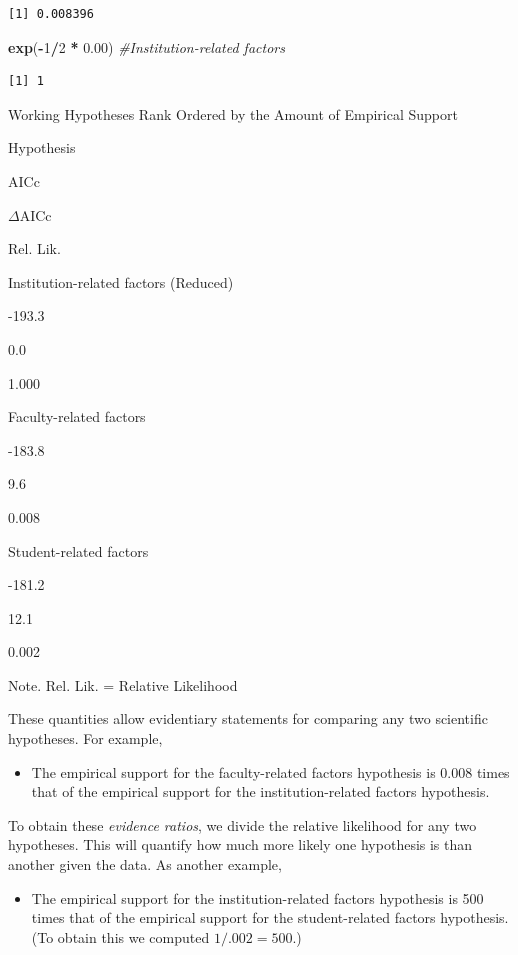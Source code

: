 \documentclass[]{book}
\newenvironment{Shaded}{\begin{snugshade}}{\end{snugshade}}
\newcommand{\CommentTok}[1]{\textcolor[rgb]{0.56,0.35,0.01}{\textit{#1}}}
\newcommand{\DecValTok}[1]{\textcolor[rgb]{0.00,0.00,0.81}{#1}}
\newcommand{\FloatTok}[1]{\textcolor[rgb]{0.00,0.00,0.81}{#1}}
\newcommand{\KeywordTok}[1]{\textcolor[rgb]{0.13,0.29,0.53}{\textbf{#1}}}
\newcommand{\NormalTok}[1]{#1}
\newcommand{\OperatorTok}[1]{\textcolor[rgb]{0.81,0.36,0.00}{\textbf{#1}}}
\newcommand{\StringTok}[1]{\textcolor[rgb]{0.31,0.60,0.02}{#1}}
\providecommand{\tightlist}{%
  \setlength{\itemsep}{0pt}\setlength{\parskip}{0pt}}
\begin{document}
\begin{verbatim}
[1] 0.008396
\end{verbatim}

\begin{Shaded}
\begin{Highlighting}[]
\KeywordTok{exp}\NormalTok{(}\OperatorTok{-}\DecValTok{1}\OperatorTok{/}\DecValTok{2} \OperatorTok{*}\StringTok{  }\FloatTok{0.00}\NormalTok{) }\CommentTok{#Institution-related factors}
\end{Highlighting}
\end{Shaded}

\begin{verbatim}
[1] 1
\end{verbatim}

\label{tab:unnamed-chunk-186}Working Hypotheses Rank Ordered by the Amount of Empirical Support

Hypothesis

AICc

\(\Delta\)AICc

Rel. Lik.

Institution-related factors (Reduced)

-193.3

0.0

1.000

Faculty-related factors

-183.8

9.6

0.008

Student-related factors

-181.2

12.1

0.002

{Note.} Rel. Lik. = Relative Likelihood

These quantities allow evidentiary statements for comparing any two scientific hypotheses. For example,

\begin{itemize}
\tightlist
\item
  The empirical support for the faculty-related factors hypothesis is 0.008 times that of the empirical support for the institution-related factors hypothesis.
\end{itemize}

To obtain these \emph{evidence ratios}, we divide the relative likelihood for any two hypotheses. This will quantify how much more likely one hypothesis is than another given the data. As another example,

\begin{itemize}
\tightlist
\item
  The empirical support for the institution-related factors hypothesis is 500 times that of the empirical support for the student-related factors hypothesis. (To obtain this we computed \(1/.002=500\).)
\end{itemize}
\end{document}
